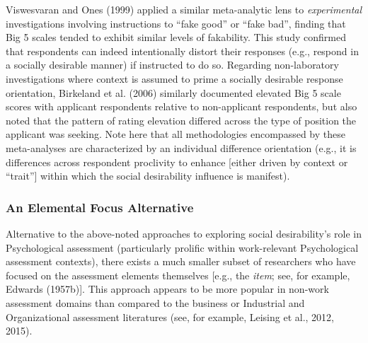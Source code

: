 \documentclass[
  ,man]{apa6}
\begin{document}
Viswesvaran and Ones (1999) applied a similar meta-analytic lens to \emph{experimental} investigations involving instructions to ``fake good'' or ``fake bad'', finding that Big 5 scales tended to exhibit similar levels of fakability. This study confirmed that respondents can indeed intentionally distort their responses (e.g., respond in a socially desirable manner) if instructed to do so. Regarding non-laboratory investigations where context is assumed to prime a socially desirable response orientation, Birkeland et al. (2006) similarly documented elevated Big 5 scale scores with applicant respondents relative to non-applicant respondents, but also noted that the pattern of rating elevation differed across the type of position the applicant was seeking. Note here that all methodologies encompassed by these meta-analyses are characterized by an individual difference orientation (e.g., it is differences across respondent proclivity to enhance {[}either driven by context or ``trait''{]} within which the social desirability influence is manifest).

\hypertarget{an-elemental-focus-alternative}{%
\subsubsection{An Elemental Focus Alternative}\label{an-elemental-focus-alternative}}

Alternative to the above-noted approaches to exploring social desirability's role in Psychological assessment (particularly prolific within work-relevant Psychological assessment contexts), there exists a much smaller subset of researchers who have focused on the assessment elements themselves {[}e.g., the \emph{item}; see, for example, Edwards (1957b){]}. This approach appears to be more popular in non-work assessment domains than compared to the business or Industrial and Organizational assessment literatures (see, for example, Leising et al., 2012, 2015).
\end{document}
